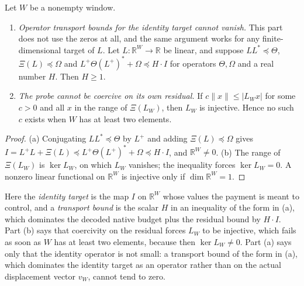 \begin{proposition}
\label{prop:rh:window-obstructions}
Let \(W\) be a nonempty window.
\begin{enumerate}[label=\textup{(\alph*)}]
  \item \emph{Operator transport bounds for the identity target cannot
    vanish.}  This part does not use the zeros at all, and the same
    argument works for any finite-dimensional target of \(L\).  Let
    \(L:\mathbb R^W\to\mathbb R\) be linear, and suppose
    \(LL^*\preceq\Theta\), \(\Xi(L)\preceq\Omega\) and
    \(L^+\Theta(L^+)^*+\Omega\preceq H\cdot I\) for operators
    \(\Theta,\Omega\) and a real number \(H\).  Then \(H\geq1\).
  \item \emph{The probe cannot be coercive on its own residual.}  If
    \(c\|x\|\leq|L_W x|\) for some \(c>0\) and all \(x\) in the range of
    \(\Xi(L_W)\), then \(L_W\) is injective.  Hence no such \(c\) exists when \(W\) has at
    least two elements.
\end{enumerate}
\end{proposition}

\begin{proof}
(a) Conjugating \(LL^*\preceq\Theta\) by \(L^+\) and adding
\(\Xi(L)\preceq\Omega\) gives
\(I=L^+L+\Xi(L)\preceq L^+\Theta(L^+)^*+\Omega\preceq H\cdot I\), and
\(\mathbb R^W\neq0\).  (b) The range of \(\Xi(L_W)\) is \(\ker L_W\), on
which \(L_W\) vanishes; the inequality forces \(\ker L_W=0\).  A nonzero
linear functional on \(\mathbb R^W\) is injective only if
\(\dim\mathbb R^W=1\).
\end{proof}

Here the \emph{identity target} is the map \(I\) on \(\mathbb R^W\) whose
values the payment is meant to control, and a \emph{transport bound} is
the scalar \(H\) in an inequality of the form in (a), which dominates the
decoded native budget plus the residual bound by \(H\cdot I\).  Part (b) says that coercivity on the residual forces \(L_W\) to be
injective, which fails as soon as \(W\) has at least two elements,
because then \(\ker L_W\neq0\).  Part (a) says only that
the identity operator is not small: a transport
bound of the form in (a), which dominates the identity target as an
operator rather than on the actual displacement vector \(v_W\), cannot
tend to zero.

